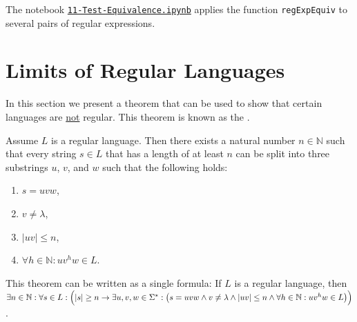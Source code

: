 The notebook
\href{https://github.com/karlstroetmann/Formal-Languages/blob/master/Python/Chapter-04-05/11-Test-Equivalence.ipynb}{\texttt{11-Test-Equivalence.ipynb}}
applies the function \texttt{regExpEquiv} to several pairs of regular expressions.

\section{Limits of Regular Languages}
In this section we present a theorem that can be used to show that certain languages are
\underline{not} regular.  This theorem is known as the 
\href{https://en.wikipedia.org/wiki/Pumping_lemma_for_regular_languages}{}.

\begin{Theorem} \lb
  Assume $L$ is a regular language.  Then there exists a natural number $n \in \mathbb{N}$ such that
  every string $s \in L$ that has a length of at least $n$ can be split into three substrings $u$,
  $v$, and $w$ such that the following holds:
  \begin{enumerate}
  \item $s= uvw$,
  \item $v \not= \lambda$,
  \item $|uv| \leq n$,
  \item $\forall h \in \mathbb{N}: uv^hw \in L$.
  \end{enumerate}
  This theorem can be written as a single formula:  If $L$ is a regular language, then 
  \\[0.2cm]
  \hspace*{0.3cm}
  $\exists n \in \mathbb{N}:\forall s \in L : \Bigl(|s| \geq n \rightarrow \exists u,v,w\in \Sigma^* :
   \bigl(s = uvw \wedge v \not= \lambda \wedge |uv| \leq n \wedge 
    \forall h \in \mathbb{N}: uv^h w \in L\bigr)
   \Bigr)
  $.
\end{Theorem}

